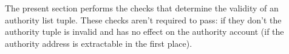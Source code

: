 The present section performs the checks that determine the validity of an authority list tuple.
These checks aren't required to pass: if they don't the authority tuple is invalid and has no
effect on the authority account (if the authority address is extractable in the first place).
